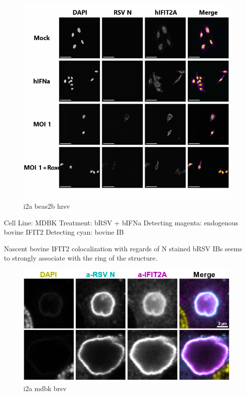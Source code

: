 \begin{figure}
    \centering
    \includegraphics[width=1\linewidth]{10. Chapter 5//Figs//01. I2A/07. i2a beas2b hrsv.png}
    \caption[i2a beas2b hrsv]{i2a beas2b hrsv}
    \label{fig:i2a beas2b hrsv}
\end{figure}

Cell Line: MDBK \newline
Treatment: bRSV + bIFNa \newline
Detecting magenta: endogenous bovine IFIT2  \newline
Detecting cyan: bovine IB \newline

Nascent bovine IFIT2 colocalization with regards of N stained bRSV IBs seems to strongly associate with the ring of the structure.

\begin{figure}
    \centering
    \includegraphics[width=1\linewidth]{10. Chapter 5//Figs//01. I2A/08. i2a mdbk brsv.png}
    \caption[i2a mdbk brsv]{i2a mdbk brsv}
    \label{fig:i2a mdbk brsv}
\end{figure}

